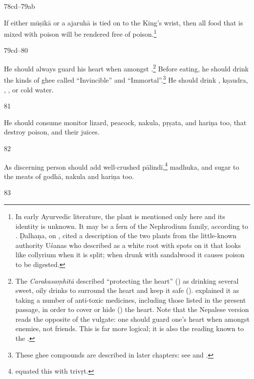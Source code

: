 \begin{translation}
\item[78cd--79ab]

If either \gls{mūṣikā} %
or a \gls{ajaruhā} is tied on to the King's wrist, then all food that is mixed
with poison will be rendered free of poison.\footnote{In early Ayurvedic
    literature, the plant  is mentioned only here and its identity is
    unknown.  It may be a fern of the Nephrodium family, according to
    \citet[7]{gvdb}.  Ḍalhaṇa, on , cited a description of the two
    plants from the little-known authority Uśanas \citep[IA, 660 et
    passim]{meul-hist} who described  as a white root with spots on
    it that looks like collyrium when it is split; when drunk with sandalwood it
    causes poison to be digested.}


\item[79cd--80]

He should always guard his heart when amongst .\footnote{The \emph{Carakasaṃhitā} described “protecting the
    heart” () as drinking several sweet, oily drinks to
    surround the heart and keep it safe ().
     explained it as taking a number of anti-toxic
    medicines, including those listed in the present passage, in order to
    cover or hide () the heart.  Note that the Nepalese
    version reads the opposite of the vulgate: one should guard one's heart
    when amongst enemies, not friends.  This is far more logical; it is also
    the reading known to the .} Before eating, he should drink
    the kinds of ghee called 
    “Invincible” and “Immortal”.\footnote{These ghee compounds are described
        in later chapters: see  and .} He
        should drink , \gls{kṣaudra}, ,
        , or cold water.


\item[81]

He should consume monitor lizard, peacock, \gls{nakula}, \gls{pṛṣata},
and \gls{hariṇa} too, that destroy poison, and their juices.

\item [82]

As discerning person should add well-crushed
\gls{pālindī},\footnote{ equated this with
    \gls{trivṛt}.} \gls{madhuka}, and sugar to the meats of \gls{godhā},
    \gls{nakula} and \gls{hariṇa} too. 
\item[83]


\end{translation}
